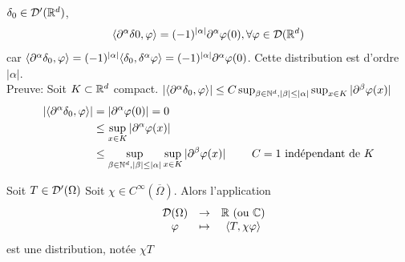 \documentclass[]{report}
\begin{document}
    \begin{ex}{}{}
        $\delta_0\in \mathcal{D}'(\mathbb{R}^d)$,
        \[\langle \partial^{\alpha}\delta 0,\varphi \rangle=(-1)^{|\alpha|}\partial^\alpha\varphi(0),\forall \varphi\in \mathcal{D}(\mathbb{R}^d)\]
        car $\langle \partial^{\alpha}\delta_0,\varphi \rangle=(-1)^{|\alpha|}\langle \delta_0,\delta^{\alpha}\varphi \rangle=(-1)^{|\alpha|}\partial^{\alpha}\varphi(0)$. Cette distribution est d'ordre $|\alpha|$.\\
        Preuve: Soit $K\subset \mathbb{R}^d$ compact. $\left|\langle \partial^\alpha \delta_0,\varphi \rangle\right|\le C\sup_{\beta\in \mathbb{N}^d,|\beta|\le |\alpha|} \sup_{x\in K}|\partial^{\beta} \varphi(x)|$
        \begin{align*}
            \left|\langle \partial^\alpha \delta_0,\varphi \rangle\right|&=\left|\partial^\alpha \varphi(0)\right|= 0\\
            &\le \sup_{x\in K}\left|\partial^\alpha \varphi(x)\right|\\
            &\le \sup_{\beta\in \mathbb{N}^d,|\beta|\le |\alpha|} \sup_{x\in K}|\partial^{\beta} \varphi(x)| \qquad \text{ $C=1$ indépendant de $K$}
        \end{align*}
    \end{ex}

    \begin{prop}{}{}
        Soit $T\in \mathcal{D}'(\Omega)$ Soit $\chi\in C^\infty(\overline{\Omega})$. Alors l'application
        \[\begin{array}{ccccc} & \mathcal{D}(\Omega) & \to & \mathbb{R}\text{ (ou $\mathbb{C}$)} \\ & \varphi & \mapsto & \langle T,\chi \varphi \rangle \end{array}\]
        est une distribution, notée $\chi T$
    \end{prop}
\end{document}
